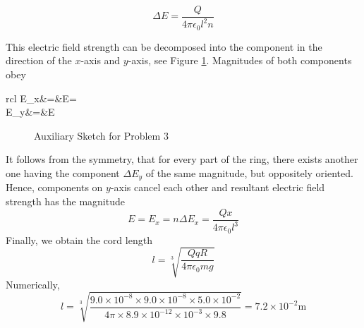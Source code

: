 \documentclass[12pt,a4paper]{book}
\begin{document}
	\begin{equation*}
		\Delta E=\frac{Q}{4\pi\epsilon_0l^2n}
	\end{equation*}\par
	This electric f\mbox{}ield strength can be decomposed into the component in the direction of the $x$-axis and $y$-axis, see Figure \ref{sketch_3_3_2}. Magnitudes of both components obey
	\begin{IEEEeqnarray*}{rcl}
		\Delta E_x&\text{ }=\text{ }&\Delta E\cos\alpha=\\
		\Delta E_y&=&\Delta E\sin\alpha
	\end{IEEEeqnarray*}
	\begin{figure}
		[!hbtp]
		\centering
		\caption{Auxiliary Sketch for Problem 3}
		\label{sketch_3_3_2}
	\end{figure}\par
	It follows from the symmetry, that for every part of the ring, there exists another one having the component $\Delta E_y$ of the same magnitude, but oppositely oriented. Hence, components on $y$-axis cancel each other and resultant electric f\mbox{}ield strength has the magnitude
	\begin{equation*}
		E=E_x=n\Delta E_x=\frac{Qx}{4\pi\epsilon_0l^3}
	\end{equation*}
	Finally, we obtain the cord length
	\begin{equation}
		l=\sqrt[3]{\frac{QqR}{4\pi\epsilon_0mg}}
	\end{equation}
	Numerically,
	\begin{equation*}
		l=\sqrt[3]{\frac{9.0\times10^{-8}\times9.0\times10^{-8}\times5.0\times10^{-2}}{4\pi\times8.9\times10^{-12}\times10^{-3}\times9.8}}=7.2\times10^{-2}\text{m}
	\end{equation*}
\end{document}
